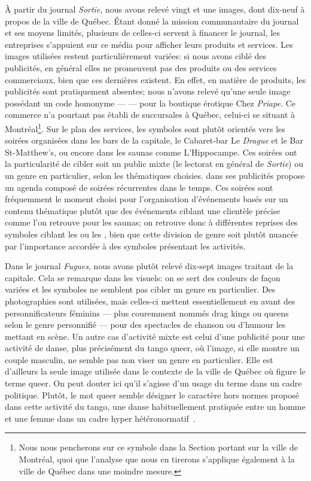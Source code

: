 À partir du journal \emph{Sortie}, nous avons relevé vingt et une images, dont dix-neuf à propos de la ville de Québec.
Étant donné la mission communautaire du journal et ses moyens limités, plusieurs de celles-ci servent à financer le journal, les entreprises s'appuient sur ce média pour afficher leurs produits et services.
Les images utilisées restent particulièrement variées: si nous avons ciblé des publicités, en général elles ne promeuvent pas des produits ou des services commerciaux, bien que ces dernières existent.
En effet, en matière de produits, les publicités sont pratiquement absentes; nous n'avons relevé qu'une seule image possédant un code homonyme ---  --- pour la boutique érotique Chez \emph{Priape}.
Ce commerce n'a pourtant pas établi de succursales à Québec, celui-ci se situant à Montréal\footnote{Nous nous pencherons sur ce symbole dans la Section portant sur la ville de Montréal, quoi que l'analyse que nous en tirerons s'applique également à la ville de Québec dans une moindre mesure.}.
Sur le plan des services, les symboles sont plutôt orientés vers les soirées organisées dans les bars de la capitale, le Cabaret-bar Le \emph{Drague} et le Bar St-Matthew’s, ou encore dans les saunas comme L'Hippocampe.
Ces soirées ont la particularité de cibler soit un public mixte (le lectorat en général de \emph{Sortie}) ou un genre en particulier, selon les thématiques choisies.
 dans ses publicités propose un agenda composé de soirées récurrentes dans le temps.
Ces soirées sont fréquemment le moment choisi pour l'organisation d'événements basés sur un contenu thématique plutôt que des événements ciblant une clientèle précise comme l'on retrouve pour les saunas; on retrouve donc à différentes reprises des symboles ciblant les  ou les , bien que cette division de genre soit plutôt nuancée par l'importance accordée à des symboles présentant les activités.

Dans le journal \emph{Fugues}, nous avons plutôt relevé dix-sept images traitant de la capitale.
Cela se remarque dans les visuels: on se sert des couleurs de façon variées et les symboles ne semblent pas cibler un genre en particulier.
Des photographies sont utilisées, mais celles-ci mettent essentiellement en avant des personnificateurs féminins --- plus couremment nommés drag kings ou queens selon le genre personnifié --- pour des spectacles de chanson ou d'humour les mettant en scène.
Un autre cas d'activité mixte est celui d'une publicité pour une activité de danse, plus précisément du tango queer, où l'image, si elle montre un couple masculin, ne semble pas non viser un genre en particulier.
Elle est d'ailleurs la seule image utilisée dans le contexte de la ville de Québec où figure le terme queer.
On peut douter ici qu'il s'agisse d'un usage du terme dans un cadre politique.
Plutôt, le mot queer semble désigner le caractère hors normes proposé dans cette activité du tango, une danse habituellement pratiquée entre un homme et une femme dans un cadre hyper hétéronormatif~\citep[135]{Savigliano2010}.

